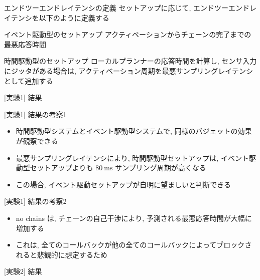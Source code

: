 \begin{frame}{エンドツーエンドレイテンシの定義}
    セットアップに応じて, エンドツーエンドレイテンシを以下のように定義する
    \begin{block}{イベント駆動型のセットアップ}
        アクティベーションからチェーンの完了までの最悪応答時間
    \end{block}
    \begin{block}{時間駆動型のセットアップ}
        ローカルプランナーの応答時間を計算し, センサ入力にジッタがある場合は, アクティベーション周期を最悪サンプリングレイテンシとして追加する
    \end{block}
\end{frame}


\begin{frame}{[実験1] 結果}
\end{frame}

\begin{frame}{[実験1] 結果の考察1}
    \begin{itemize}
        \item 時間駆動型システムとイベント駆動型システムで, 同様のバジェットの効果が観察できる
        \item 最悪サンプリングレイテンシにより, 時間駆動型セットアップは, イベント駆動型セットアップよりも $80 \mathrm{~ms}$ サンプリング周期が高くなる
        \item この場合, イベント駆動セットアップが自明に望ましいと判断できる
    \end{itemize}
\end{frame}

\begin{frame}{[実験1] 結果の考察2}
    \begin{itemize}
        \item no chains は, チェーンの自己干渉により, 予測される最悪応答時間が大幅に増加する
        \item これは, 全てのコールバックが他の全てのコールバックによってブロックされると悲観的に想定するため
    \end{itemize}
\end{frame}

\begin{frame}{[実験2] 結果}
\end{frame}

